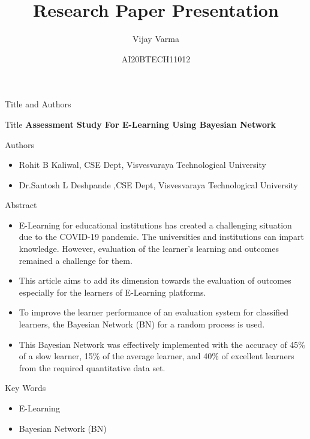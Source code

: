 \documentclass{beamer}
\title{Research Paper Presentation}
\author{Vijay Varma}
\institute{IITH(AI)}
\date{AI20BTECH11012}
\begin{document}
%
\begin{frame}
\titlepage
\end{frame}
\begin{frame}{Title and Authors}
\begin{block}{Title}
\textbf{Assessment Study For E-Learning Using Bayesian Network}
\end{block}
\begin{block}{Authors}
\begin{itemize}
    \item Rohit B Kaliwal, CSE Dept, Visvesvaraya Technological University
    \item Dr.Santosh L Deshpande ,CSE Dept, Visvesvaraya Technological University
\end{itemize}
\end{block}
\end{frame}
\begin{frame}
\begin{block}{Abstract}
    \begin{itemize}
        \item E-Learning for educational institutions has created a challenging situation due to the COVID-19 pandemic. The universities and institutions can impart knowledge. However, evaluation of the learner’s learning and outcomes remained a challenge for them.
        \item This article aims to add its dimension towards the evaluation of outcomes especially for the learners of E-Learning platforms.
        \item To improve the learner performance of an evaluation system for classified learners, the Bayesian Network (BN) for a random process is used.
        \item This Bayesian Network was effectively implemented with the accuracy of 45\% of a slow learner, 15\% of the average learner, and 40\% of excellent learners from the required quantitative data set.
    \end{itemize}
    \end{block}
    \end{frame}
    \begin{frame}
    \begin{block}{Key Words}
       \begin{itemize}
           \item E-Learning
           \item Bayesian Network (BN)
       \end{itemize}
    \end{block}
    \end{frame}
\end{document}
